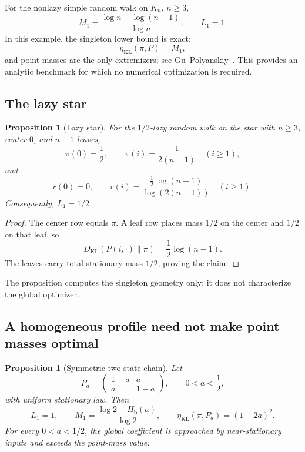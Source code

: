\documentclass[11pt]{article}
\newtheorem{proposition}[theorem]{Proposition}
\newcommand{\KL}{D_{\mathrm{KL}}}
\newcommand{\etaKL}{\eta_{\mathrm{KL}}}
\newcommand{\etaStat}{\eta_{\mathrm{KL}}(\pi,P)}
\newcommand{\Mone}{M_1}
\newcommand{\Lone}{L_1}
\begin{document}
For the nonlazy simple random walk on \(K_n\), \(n\ge3\),
\[
  \Mone
  =
  \frac{\log n-\log(n-1)}{\log n},
  \qquad
  \Lone=1.
\]
In this example, the singleton lower bound is exact:
\[
  \etaStat=\Mone,
\]
and point masses are the only extremizers; see
Gu--Polyanskiy~\cite[Proposition~18 and Section~5.2]{GuPolyanskiy2023}.
This provides an analytic benchmark for which no numerical optimization
is required.

\subsection{The lazy star}

\begin{proposition}[Lazy star]
\label{prop:star}
For the \(1/2\)-lazy random walk on the star with \(n\ge3\), center \(0\), and
\(n-1\) leaves,
\[
  \pi(0)=\frac12,\qquad
  \pi(i)=\frac{1}{2(n-1)}\quad(i\ge1),
\]
and
\[
  r(0)=0,\qquad
  r(i)=
  \frac{\frac12\log(n-1)}{\log(2(n-1))}
  \quad(i\ge1).
\]
Consequently, \(\Lone=1/2\).
\end{proposition}

\begin{proof}
The center row equals \(\pi\).  A leaf row places mass \(1/2\) on the
center and \(1/2\) on that leaf, so
\[
  \KL(P(i,\cdot)\|\pi)=\frac12\log(n-1).
\]
The leaves carry total stationary mass \(1/2\), proving the claim.
\end{proof}

The proposition computes the singleton geometry only; it does not
characterize the global optimizer.

\subsection{A homogeneous profile need not make point masses optimal}

\begin{proposition}[Symmetric two-state chain]
\label{prop:binary}
Let
\[
  P_a=
  \begin{pmatrix}
    1-a&a\\
    a&1-a
  \end{pmatrix},
  \qquad 0<a<\frac12,
\]
with uniform stationary law.  Then
\[
  \Lone=1,\qquad
  \Mone=
  \frac{\log2-H_{\mathrm b}(a)}{\log2},
  \qquad
  \etaKL(\pi,P_a)=(1-2a)^2.
\]
For every \(0<a<1/2\), the global coefficient is approached by
near-stationary inputs and exceeds the point-mass value.
\end{proposition}
\end{document}
